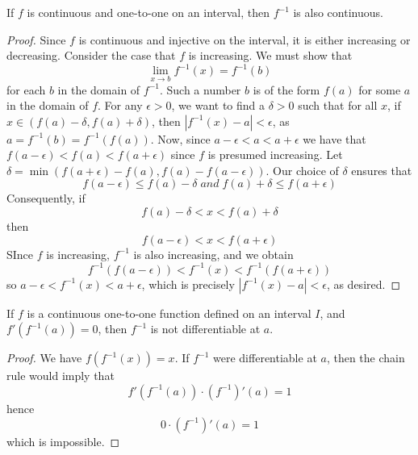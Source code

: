 \documentclass[12pt, a4paper, oneside, openright, titlepage]{book}
\begin{document}
\begin{thm}
    If $f$ is continuous and one-to-one on an interval, then $f^{-1}$ is also continuous.
\end{thm}
\begin{proof}
    Since $f$ is continuous and injective on the interval, it is either increasing or decreasing. Consider the case that $f$ is increasing. We must show that \begin{equation*}
        \lim\limits_{x\rightarrow b}f^{-1}(x) = f^{-1}(b)
    \end{equation*}
    for each $b$ in the domain of $f^{-1}$. Such a number $b$ is of the form $f(a)$ for some $a$ in the domain of $f$. For any $\epsilon > 0$, we want to find a $\delta > 0$ such that for all $x$, if $x \in (f(a) - \delta, f(a) + \delta)$, then $|f^{-1}(x) - a| < \epsilon$, as $a = f^{-1}(b) = f^{-1}(f(a))$. Now, since $a-\epsilon < a <a+\epsilon$ we have that $f(a-\epsilon) < f(a) < f(a+\epsilon)$ since $f$ is presumed increasing. Let $\delta = \min(f(a+\epsilon)-f(a),f(a) - f(a-\epsilon))$. Our choice of $\delta$ ensures that $$f(a-\epsilon) \leq f(a) - \delta\;and\;f(a) + \delta \leq f(a+\epsilon)$$
    Consequently, if $$f(a) - \delta < x < f(a) + \delta$$ then $$f(a-\epsilon) < x < f(a+\epsilon)$$
    SInce $f$ is increasing, $f^{-1}$ is also increasing, and we obtain $$f^{-1}(f(a-\epsilon)) < f^{-1}(x) < f^{-1}(f(a+\epsilon))$$
    so $a-\epsilon < f^{-1}(x) < a+\epsilon$, which is precisely $|f^{-1}(x) - a| < \epsilon$, as desired.
\end{proof}


\begin{thm}
    If $f$ is a continuous one-to-one function defined on an interval $I$, and $f'(f^{-1}(a)) = 0$, then $f^{-1}$ is not differentiable at $a$.
\end{thm}
\begin{proof}
    We have $f(f^{-1}(x)) = x$. If $f^{-1}$ were differentiable at $a$, then the chain rule would imply that $$f'(f^{-1}(a))\cdot (f^{-1})'(a) = 1$$
    hence $$0\cdot (f^{-1})'(a) = 1$$
    which is impossible.
\end{proof}
\end{document}
